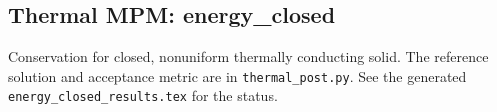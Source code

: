 \subsection{Thermal MPM: energy\_closed}
Conservation for closed, nonuniform thermally conducting solid. The reference solution and acceptance metric are in \texttt{thermal\_post.py}. See the generated \texttt{energy\_closed\_results.tex} for the status.
